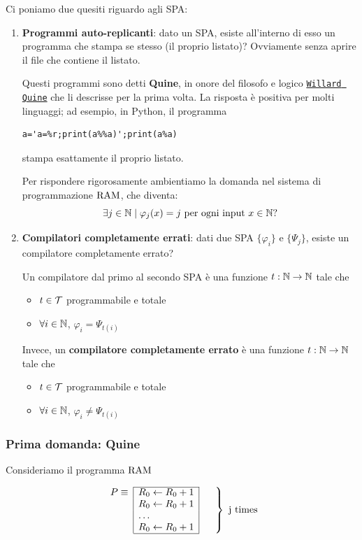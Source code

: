 Ci poniamo due quesiti riguardo agli SPA:
\begin{enumerate}
	\item \textbf{Programmi auto-replicanti}: dato un SPA, esiste all'interno di esso un programma che stampa se stesso (il proprio listato)? Ovviamente senza aprire il file che contiene il listato.

	Questi programmi sono detti \textbf{Quine}, in onore del filosofo e logico \href{https://it.wikipedia.org/wiki/Willard_Van_Orman_Quine}{\texttt{Willard Quine}} che li descrisse per la prima volta. La risposta è positiva per molti linguaggi; ad esempio, in Python, il programma
	\begin{verbatim}
a='a=%r;print(a%%a)';print(a%a)
	\end{verbatim}
	stampa esattamente il proprio listato.

	Per rispondere rigorosamente ambientiamo la domanda nel sistema di programmazione $\text{RAM}$, che diventa:
	$$ \exists j \in \mathbb{N} \mid \varphi_j (x) = j \text{ per ogni input } x \in \mathbb{N} \text{?}$$

	\item \textbf{Compilatori completamente errati}: dati due SPA $\{\varphi_i\}$ e $\{\Psi_j\}$, esiste un compilatore completamente errato?

	Un compilatore dal primo al secondo SPA è una funzione $t: \mathbb{N} \rightarrow \mathbb{N}$ tale che
	\begin{itemize}
		\item $t \in \mathcal{T}$ programmabile e totale
		\item $\forall i \in \mathbb{N}$, $\varphi_i = \Psi_{t(i)}$
	\end{itemize}

	Invece, un \textbf{compilatore completamente errato} è una funzione $t: \mathbb{N} \rightarrow \mathbb{N}$ tale che
	\begin{itemize}
		\item $t \in \mathcal{T}$ programmabile e totale
		\item $\forall i \in \mathbb{N}$, $\varphi_i \neq \Psi_{t(i)}$
	\end{itemize}
\end{enumerate}

\subsubsection{Prima domanda: Quine}
Consideriamo il programma $\text{RAM}$

\begin{center}
\[
\begin{array}{r|l|}
    \cline{2-2}
    P \equiv & R_0 \leftarrow R_0 + 1 \\
            & R_0 \leftarrow R_0 + 1 \\
            & \dots \\
            & R_0 \leftarrow R_0 + 1 \\
    \cline{2-2}
\end{array}
\left.
\begin{array}{c}
~ \\
~ \\
~ \\
~
\end{array}
\right\} \text{ j times}
\]
\end{center}

